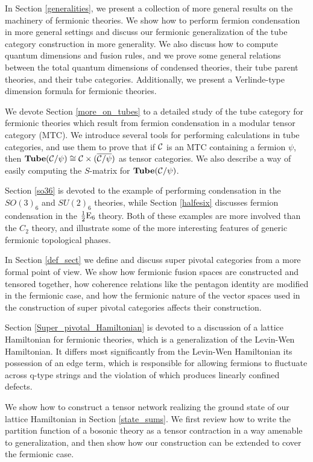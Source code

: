 In Section \ref{generalities}, we present a collection of more general results
on the machinery of fermionic theories. 
We show how to perform fermion condensation in more general settings
and discuss our fermionic generalization 
of the tube category construction in more generality.
We also discuss how to compute quantum dimensions and fusion rules,
and we prove some general
relations between the total quantum dimensions of condensed theories, their 
tube parent theories, and their tube categories.
Additionally, we present a Verlinde-type
dimension formula for fermionic theories.

We devote Section \ref{more_on_tubes} to a detailed study of the tube category 
for fermionic theories which result from fermion condensation in a modular tensor category (MTC). 
We introduce several tools for performing calculations in tube categories, 
and use them to prove that if $\mathcal{C}$ is an MTC containing a fermion $\psi$, then
$\textbf{Tube}(\mathcal{C}/\psi)\cong \mathcal{C}\times (\overline{\mathcal{C}/\psi})$ as tensor 
categories. We also describe a way of easily computing the $S$-matrix for 
$\textbf{Tube}(\mathcal{C}/\psi)$. 

Section \ref{so36} is devoted to the example of performing condensation in the $SO(3)_6$ 
and $SU(2)_6$ theories, while Section \ref{halfesix} discusses fermion condensation in the $
\frac{1}{2}\text{E}_6$ theory. 
Both of these examples are more involved than the $C_2$ theory, 
and illustrate some of the more interesting features of generic fermionic topological phases. 

In Section \ref{def_sect} we define and discuss super pivotal categories from a more formal point of view. 
We show how fermionic fusion spaces are constructed and tensored together, how 
coherence relations like the pentagon identity are modified in the fermionic case, 
and how the fermionic nature of the vector spaces used in the construction of super 
pivotal categories affects their construction. 

Section \ref{Super_pivotal_Hamiltonian} is devoted to a discussion of a lattice Hamiltonian for fermionic theories, which is a generalization of the Levin-Wen Hamiltonian. 
It differs most significantly from the Levin-Wen Hamiltonian its possession of an edge term, which 
is responsible for allowing fermions to fluctuate across q-type strings and the violation 
of which produces linearly confined defects. 

We show how to construct a tensor network realizing the ground state of our lattice Hamiltonian 
in Section \ref{state_sums}. We first review how to write the partition function of a bosonic theory 
as a tensor contraction in a way amenable to generalization, and then show how our construction 
can be extended to cover the fermionic case. 

